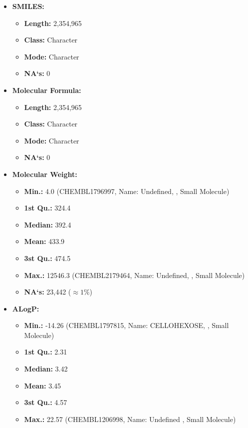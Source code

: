 \documentclass[10pt]{article}
\begin{document}
\begin{itemize}
     \item \textbf{SMILES:}
    \begin{itemize}
        \item \textbf{Length:} 2,354,965
        \item \textbf{Class:} Character
        \item \textbf{Mode:} Character
        \item \textbf{NA`s:} 0
    \end{itemize}
     \item \textbf{Molecular Formula:}
    \begin{itemize}
        \item \textbf{Length:} 2,354,965
        \item \textbf{Class:} Character
        \item \textbf{Mode:} Character
        \item \textbf{NA`s:} 0
    \end{itemize}
    \newpage
    \item \textbf{Molecular Weight:}
    \begin{itemize}
        \item \textbf{Min.:} 4.0 (CHEMBL1796997, Name: Undefined,  , Small Molecule)
        \item \textbf{1st Qu.:} 324.4
        \item \textbf{Median:} 392.4
        \item \textbf{Mean:} 433.9
        \item \textbf{3st Qu.:} 474.5
        \item \textbf{Max.:} 12546.3 (CHEMBL2179464, Name: Undefined, , Small Molecule)
        \item \textbf{NA`s:} 23,442 ($\approx 1\% $)
    \end{itemize}
    \item \textbf{ALogP:}
    \begin{itemize}
        \item \textbf{Min.:} -14.26 (CHEMBL1797815, Name: CELLOHEXOSE,  , Small Molecule)
        \item \textbf{1st Qu.:} 2.31
        \item \textbf{Median:} 3.42
        \item \textbf{Mean:} 3.45
        \item \textbf{3st Qu.:} 4.57
        \item \textbf{Max.:} 22.57 (CHEMBL1206998, Name: Undefined  , Small Molecule)

\end{itemize}
\end{itemize}
\end{document}
